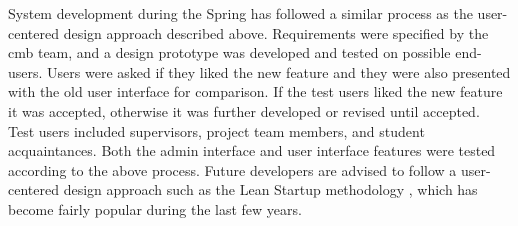 System development during the Spring has followed a similar process as the user-centered design approach described above. Requirements were specified by the \gls{cmb} team, and a design prototype was developed and tested on possible end-users. Users were asked if they liked the new feature and they were also presented with the old user interface for comparison. If the test users liked the new feature it was accepted, otherwise it was further developed or revised until accepted. \\

Test users included supervisors, project team members, and student acquaintances. Both the admin interface and user interface features were tested according to the above process. Future developers are advised to follow a user-centered design approach such as the Lean Startup methodology \cite{ries2011}, which has become fairly popular during the last few years.





